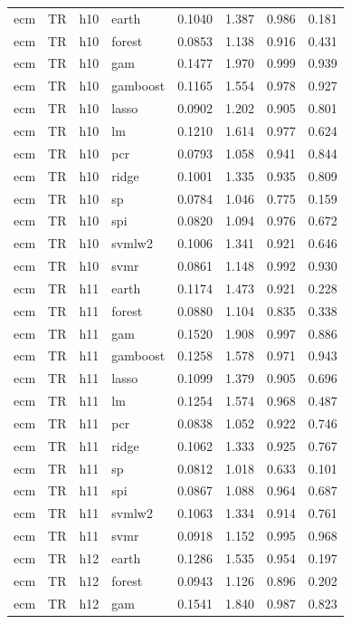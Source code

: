 \begin{ThreePartTable}
\begin{longtable}[t]{llclcccc}
\addlinespace
ecm & TR & h10 & earth & 0.1040 & 1.387 & 0.986 & 0.181\\
ecm & TR & h10 & forest & 0.0853 & 1.138 & 0.916 & 0.431\\
ecm & TR & h10 & gam & 0.1477 & 1.970 & 0.999 & 0.939\\
ecm & TR & h10 & gamboost & 0.1165 & 1.554 & 0.978 & 0.927\\
ecm & TR & h10 & lasso & 0.0902 & 1.202 & 0.905 & 0.801\\
ecm & TR & h10 & lm & 0.1210 & 1.614 & 0.977 & 0.624\\
ecm & TR & h10 & pcr & 0.0793 & 1.058 & 0.941 & 0.844\\
ecm & TR & h10 & ridge & 0.1001 & 1.335 & 0.935 & 0.809\\
ecm & TR & h10 & sp & 0.0784 & 1.046 & 0.775 & 0.159\\
ecm & TR & h10 & spi & 0.0820 & 1.094 & 0.976 & 0.672\\
ecm & TR & h10 & svmlw2 & 0.1006 & 1.341 & 0.921 & 0.646\\
ecm & TR & h10 & svmr & 0.0861 & 1.148 & 0.992 & 0.930\\
\addlinespace
ecm & TR & h11 & earth & 0.1174 & 1.473 & 0.921 & 0.228\\
ecm & TR & h11 & forest & 0.0880 & 1.104 & 0.835 & 0.338\\
ecm & TR & h11 & gam & 0.1520 & 1.908 & 0.997 & 0.886\\
ecm & TR & h11 & gamboost & 0.1258 & 1.578 & 0.971 & 0.943\\
ecm & TR & h11 & lasso & 0.1099 & 1.379 & 0.905 & 0.696\\
ecm & TR & h11 & lm & 0.1254 & 1.574 & 0.968 & 0.487\\
ecm & TR & h11 & pcr & 0.0838 & 1.052 & 0.922 & 0.746\\
ecm & TR & h11 & ridge & 0.1062 & 1.333 & 0.925 & 0.767\\
ecm & TR & h11 & sp & 0.0812 & 1.018 & 0.633 & 0.101\\
ecm & TR & h11 & spi & 0.0867 & 1.088 & 0.964 & 0.687\\
ecm & TR & h11 & svmlw2 & 0.1063 & 1.334 & 0.914 & 0.761\\
ecm & TR & h11 & svmr & 0.0918 & 1.152 & 0.995 & 0.968\\
\addlinespace
ecm & TR & h12 & earth & 0.1286 & 1.535 & 0.954 & 0.197\\
ecm & TR & h12 & forest & 0.0943 & 1.126 & 0.896 & 0.202\\
ecm & TR & h12 & gam & 0.1541 & 1.840 & 0.987 & 0.823\\

\end{longtable}
\end{ThreePartTable}
